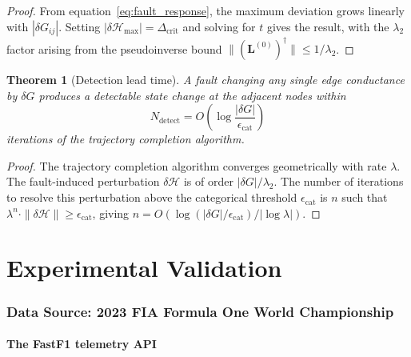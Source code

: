 \documentclass[twocolumn,10pt,a4paper]{article}
\newtheorem{theorem}{Theorem}[section]
\theoremstyle{definition}
\theoremstyle{remark}
\newcommand{\Hcal}{\mathcal{H}}
\newcommand{\vect}[1]{\boldsymbol{#1}}
\newcommand{\mat}[1]{\mathbf{#1}}
\begin{document}
\begin{proof}
From equation~\eqref{eq:fault_response}, the maximum deviation grows linearly with $|\delta G_{ij}|$. Setting $|\delta\Hcal_{\max}| = \Delta_{\mathrm{crit}}$ and solving for $t$ gives the result, with the $\lambda_2$ factor arising from the pseudoinverse bound $\|(\mat{L}^{(0)})^\dagger\| \leq 1/\lambda_2$.
\end{proof}

\begin{theorem}[Detection lead time]\label{thm:detection_lead}
A fault changing any single edge conductance by $\delta G$ produces a detectable state change at the adjacent nodes within
\begin{equation}\label{eq:detection_iter}
    N_{\mathrm{detect}} = O\left(\log\frac{|\delta G|}{\epsilon_{\mathrm{cat}}}\right)
\end{equation}
iterations of the trajectory completion algorithm.
\end{theorem}

\begin{proof}
The trajectory completion algorithm converges geometrically with rate $\lambda$. The fault-induced perturbation $\delta\vect{\Hcal}$ is of order $|\delta G| / \lambda_2$. The number of iterations to resolve this perturbation above the categorical threshold $\epsilon_{\mathrm{cat}}$ is $n$ such that $\lambda^n \cdot \|\delta\vect{\Hcal}\| \geq \epsilon_{\mathrm{cat}}$, giving $n = O(\log(|\delta G|/\epsilon_{\mathrm{cat}}) / |\log\lambda|)$.
\end{proof}



\part{Experimental Validation}\label{part:validation}

\section{Data Source: 2023 FIA Formula One World Championship}\label{sec:data}

\subsection{The FastF1 telemetry API}
\end{document}
